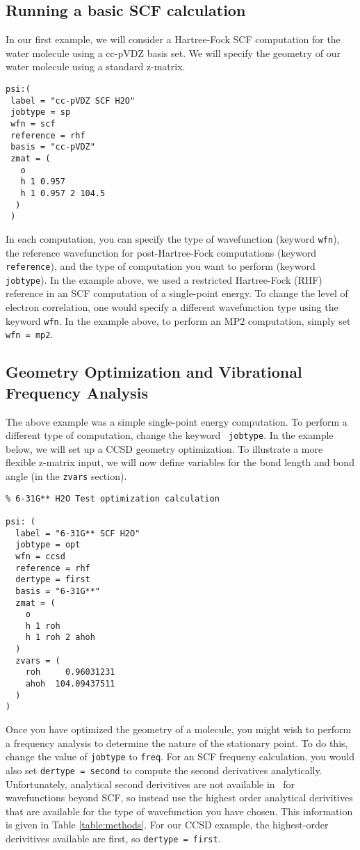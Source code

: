 \subsection{Running a basic SCF calculation}
In our first example, we will consider a Hartree-Fock SCF computation
for the water molecule using a cc-pVDZ basis set.  We will specify the
geometry of our water molecule using a standard z-matrix.

\begin{verbatim}
psi:(
 label = "cc-pVDZ SCF H2O"
 jobtype = sp
 wfn = scf
 reference = rhf
 basis = "cc-pVDZ"
 zmat = (
   o
   h 1 0.957
   h 1 0.957 2 104.5
  )
 )

\end{verbatim}

In each computation, you can specify the type of wavefunction (keyword
{\tt wfn}), the reference wavefunction for post-Hartree-Fock computations
(keyword {\tt reference}), and the type of computation you want to
perform (keyword {\tt jobtype}).  In the example above, we used a
restricted Hartree-Fock (RHF) reference in an SCF computation of a
single-point energy.  To change the level of electron correlation, one
would specify a different wavefunction type using the keyword {\tt wfn}.
In the example above, to perform an MP2 computation, simply set {\tt
wfn = mp2}.

\subsection{Geometry Optimization and Vibrational Frequency Analysis}
The above example was a simple single-point energy computation.
To perform a different type of computation, change the keyword {\tt
jobtype}.  In the example below, we will set up
a CCSD geometry optimization.  To illustrate a more flexible z-matrix
input, we will now define variables for the bond length and bond angle
(in the {\tt zvars} section).

\begin{verbatim}
% 6-31G** H2O Test optimization calculation

psi: (
  label = "6-31G** SCF H2O"
  jobtype = opt
  wfn = ccsd
  reference = rhf
  dertype = first
  basis = "6-31G**"
  zmat = (
    o
    h 1 roh
    h 1 roh 2 ahoh
  )
  zvars = (
    roh     0.96031231
    ahoh  104.09437511
  )
)
\end{verbatim}

Once you have optimized the geometry of a molecule, you might wish to
perform a frequency analysis to determine the nature of the stationary
point.  To do this, change the value of {\tt jobtype} to {\tt freq}.
For an SCF frequeny calculation, you would also set {\tt dertype =
second} to compute the second derivatives analytically.  Unfortunately,
analytical second derivitives are not available in \PSIfour\ for
wavefunctions beyond SCF, so instead use the highest order analytical
derivitives that are available for the type of wavefunction you
have chosen.  This information is given in Table \ref{table:methods}.
For our CCSD example, the highest-order derivitives available are first,
so {\tt dertype = first}.

